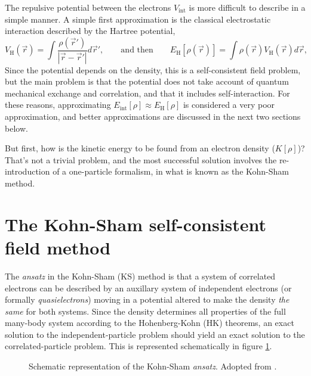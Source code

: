 \documentclass[11pt,bibliography=totoc,index=totoc]{scrbook}   %
\begin{document}
The repulsive potential between the electrons $V_{\text{int}}$ is more difficult to describe in a simple manner.
A simple first approximation is the classical electrostatic interaction described by the Hartree potential,
\begin{equation}
    V_{\text{H}}(\vec{r}) = \int\frac{\rho(\vec{r}')}{|\vec{r}-\vec{r}'|}d\vec{r}',
  \qquad\text{and then}\qquad
  E_{\text{H}}[\rho(\vec{r})] = \int \rho(\vec{r}) V_{\text{H}}(\vec{r}) d\vec{r},
  \label{eq:hartree-pot}
\end{equation}
Since the potential depends on the density, this is a self-consistent field problem, 
but the main problem is that the potential does not take account of quantum mechanical exchange and correlation, and that it includes self-interaction.
For these reasons, approximating $E_{\text{int}}[\rho]\approx E_{\text{H}}[\rho]$ is considered a very poor approximation,\cite[208]{Sutton:1993}
and better approximations are discussed in the next two sections below.

But first, how is the kinetic energy to be found from an electron density ($K[\rho]$)?
That's not a trivial problem, and the most successful solution involves the re-introduction of a one-particle formalism, in what is known as the Kohn-Sham method.

%
\section{The Kohn-Sham self-consistent field method}\label{sec:kohnsham}
%

The \emph{ansatz} in the Kohn-Sham (KS) method\cite{KohnSham:1965} is that a system of correlated electrons can be described by an auxillary system of independent electrons (or formally \emph{quasielectrons}) moving in a potential altered to make the density \emph{the same} for both systems. 
Since the density determines all properties of the full many-body system according to the Hohenberg-Kohn (HK) theorems, an exact solution to the independent-particle problem should yield an exact solution to the correlated-particle problem.
This is represented schematically in figure \ref{fig:kohnshamscheme}. 

\begin{figure}[htbp]
  \centering
  
  \caption{Schematic representation of the Kohn-Sham \emph{ansatz}. Adopted from \cite[137]{Martin:2004}.}
  \label{fig:kohnshamscheme}
\end{figure}
\end{document}
